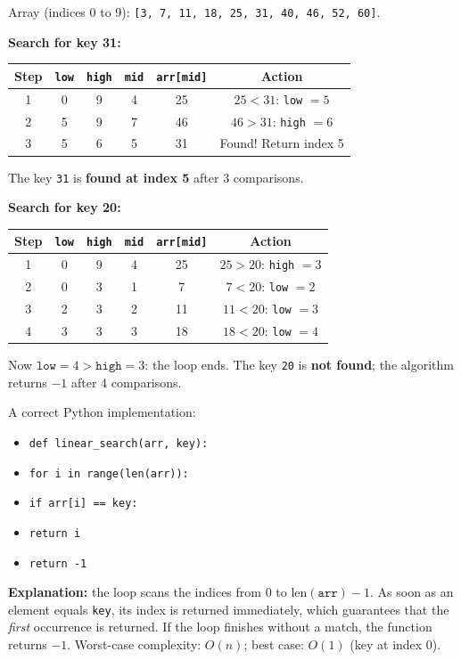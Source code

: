 \documentclass[11pt]{article}
\begin{document}
\begin{corrige}
Array (indices 0 to 9): \texttt{[3, 7, 11, 18, 25, 31, 40, 46, 52, 60]}.

\textbf{Search for key 31:}
\begin{center}
\begin{tabular}{|c|c|c|c|c|c|}
\hline
\rowcolor{popblueL} Step & \texttt{low} & \texttt{high} & \texttt{mid} & \texttt{arr[mid]} & Action \\
\hline
1 & 0 & 9 & 4 & 25 & $25 < 31$: \texttt{low} $= 5$ \\
\hline
2 & 5 & 9 & 7 & 46 & $46 > 31$: \texttt{high} $= 6$ \\
\hline
3 & 5 & 6 & 5 & 31 & Found! Return index 5 \\
\hline
\end{tabular}
\end{center}
The key \texttt{31} is \textbf{found at index 5} after 3 comparisons.

\textbf{Search for key 20:}
\begin{center}
\begin{tabular}{|c|c|c|c|c|c|}
\hline
\rowcolor{popblueL} Step & \texttt{low} & \texttt{high} & \texttt{mid} & \texttt{arr[mid]} & Action \\
\hline
1 & 0 & 9 & 4 & 25 & $25 > 20$: \texttt{high} $= 3$ \\
\hline
2 & 0 & 3 & 1 & 7 & $7 < 20$: \texttt{low} $= 2$ \\
\hline
3 & 2 & 3 & 2 & 11 & $11 < 20$: \texttt{low} $= 3$ \\
\hline
4 & 3 & 3 & 3 & 18 & $18 < 20$: \texttt{low} $= 4$ \\
\hline
\end{tabular}
\end{center}
Now $\texttt{low} = 4 > \texttt{high} = 3$: the loop ends. The key \texttt{20} is \textbf{not found}; the algorithm returns $-1$ after 4 comparisons.
\end{corrige}

\begin{corrige}
A correct Python implementation:
\begin{itemize}
\item \texttt{def linear\_search(arr, key):}
\item \quad \texttt{for i in range(len(arr)):}
\item \quad \quad \texttt{if arr[i] == key:}
\item \quad \quad \quad \texttt{return i}
\item \quad \texttt{return -1}
\end{itemize}
\textbf{Explanation:} the loop scans the indices from $0$ to $\mathrm{len}(\texttt{arr}) - 1$. As soon as an element equals \texttt{key}, its index is returned immediately, which guarantees that the \emph{first} occurrence is returned. If the loop finishes without a match, the function returns $-1$. Worst-case complexity: $O(n)$; best case: $O(1)$ (key at index 0).
\end{corrige}
\end{document}

